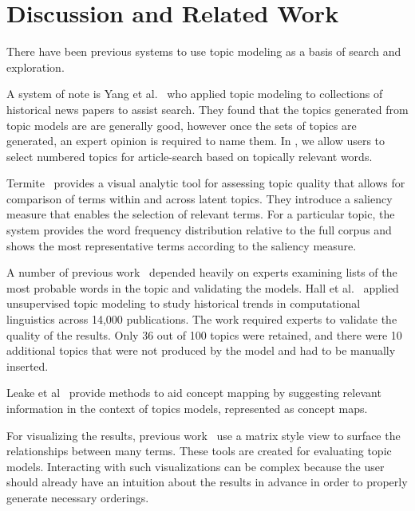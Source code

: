 
\section{Discussion and Related Work}
\label{sec:discussion}

There have been previous systems to use topic modeling as a basis of
search and exploration. 

A system of note is Yang et al.~\cite{yang2011topic} who applied topic modeling to 
collections of historical news papers to assist search. They 
found that the topics generated from topic models are 
are generally good, however once the sets of topics are 
generated, an expert opinion is required to name them. 
In \system, we allow users to select numbered topics for article-search 
based on topically relevant words.



Termite~\cite{2012-termite} provides a visual analytic tool for assessing topic quality that allows for comparison of terms within and across latent topics. They introduce a saliency measure that enables the selection of relevant terms. For a particular topic, the system provides the word frequency distribution relative to the full corpus and shows the most representative terms according to the saliency measure.

A number of previous work~\cite{chang2009reading,mimno2011optimizing,newman2010evaluating} depended heavily on experts examining lists of the most probable words in the topic and validating the models. Hall et al.~\cite{hall2008studying} applied unsupervised topic modeling to study historical trends in computational linguistics across 14,000 publications. The work required experts  to validate the quality of the results. Only 36 out of 100 topics were retained, and there were 10 additional topics that were not produced by the model and had to be manually inserted.

Leake et al~\cite{leake2003topic} provide methods to aid concept mapping by suggesting relevant information in the context of topics models, represented as concept maps. 

For visualizing the results, previous work~\cite{2012-termite,bertin1983semiology,henry2007matlink} use
 a matrix style view to surface the relationships between many terms. 
These tools are created for evaluating topic models.
Interacting with such visualizations can be complex because the user should
already have an intuition about the results in advance in order to properly generate necessary
orderings.







